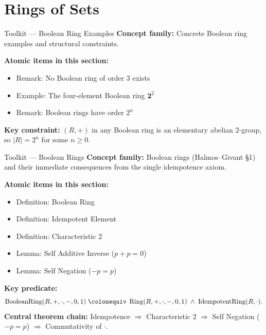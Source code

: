 \section{Rings of Sets}

\begin{toolkitbox}{Toolkit --- Boolean Ring Examples}
\textbf{Concept family:} Concrete Boolean ring examples and structural
constraints.

\medskip
\textbf{Atomic items in this section:}
\begin{itemize}
  \item Remark: No Boolean ring of order 3 exists
  \item Example: The four-element Boolean ring $\mathbf{2}^2$
  \item Remark: Boolean rings have order $2^n$
\end{itemize}

\medskip
\textbf{Key constraint:} $(R,+)$ in any Boolean ring is an elementary
abelian 2-group, so $|R| = 2^n$ for some $n \ge 0$.
\end{toolkitbox}


\begin{toolkitbox}{Toolkit --- Boolean Rings}
\textbf{Concept family:} Boolean rings (Halmos--Givant \S{}1) and their
immediate consequences from the single idempotence axiom.

\medskip
\textbf{Atomic items in this section:}
\begin{itemize}
  \item Definition: Boolean Ring
  \item Definition: Idempotent Element
  \item Definition: Characteristic 2
  \item Lemma: Self Additive Inverse ($p+p=0$)
  \item Lemma: Self Negation ($-p=p$)
\end{itemize}

\medskip
\textbf{Key predicate:}
\[
  \operatorname{BooleanRing}(R,+,\cdot,-,0,1)
  \;\colonequiv\;
  \operatorname{Ring}(R,+,\cdot,-,0,1)
  \;\land\;
  \operatorname{IdempotentRing}(R,\cdot).
\]
\textbf{Central theorem chain:} Idempotence $\Rightarrow$ Characteristic 2
$\Rightarrow$ Self Negation ($-p=p$) $\Rightarrow$ Commutativity of $\cdot$.
\end{toolkitbox}


